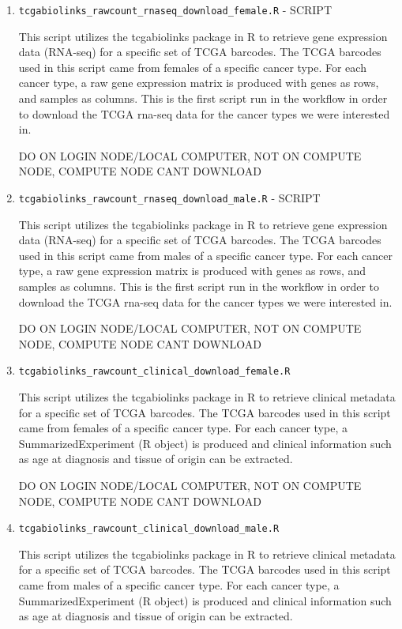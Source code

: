 \documentclass[10pt]{article}
\begin{document}
\begin{enumerate}
\item\texttt{tcgabiolinks\_rawcount\_rnaseq\_download\_female.R} - SCRIPT

This script utilizes the tcgabiolinks package in R to retrieve gene expression data (RNA-seq) for a specific set of TCGA barcodes. The TCGA barcodes used in this script came from females of a specific cancer type. For each cancer type, a raw gene expression matrix is produced with genes as rows, and samples as columns. This is the first script run in the workflow in order to download the TCGA rna-seq data for the cancer types we were interested in.

DO ON LOGIN NODE/LOCAL COMPUTER, NOT ON COMPUTE NODE, COMPUTE NODE CANT DOWNLOAD

\item\texttt{tcgabiolinks\_rawcount\_rnaseq\_download\_male.R} - SCRIPT

This script utilizes the tcgabiolinks package in R to retrieve gene expression data (RNA-seq) for a specific set of TCGA barcodes. The TCGA barcodes used in this script came from males of a specific cancer type. For each cancer type, a raw gene expression matrix is produced with genes as rows, and samples as columns. This is the first script run in the workflow in order to download the TCGA rna-seq data for the cancer types we were interested in.

DO ON LOGIN NODE/LOCAL COMPUTER, NOT ON COMPUTE NODE, COMPUTE NODE CANT DOWNLOAD

\item\texttt{tcgabiolinks\_rawcount\_clinical\_download\_female.R}

This script utilizes the tcgabiolinks package in R to retrieve clinical metadata for a specific set of TCGA barcodes. The TCGA barcodes used in this script came from females of a specific cancer type. For each cancer type, a SummarizedExperiment (R object) is produced and clinical information such as age at diagnosis and tissue of origin can be extracted.

DO ON LOGIN NODE/LOCAL COMPUTER, NOT ON COMPUTE NODE, COMPUTE NODE CANT DOWNLOAD

\item\texttt{tcgabiolinks\_rawcount\_clinical\_download\_male.R}

This script utilizes the tcgabiolinks package in R to retrieve clinical metadata for a specific set of TCGA barcodes. The TCGA barcodes used in this script came from males of a specific cancer type. For each cancer type, a SummarizedExperiment (R object) is produced and clinical information such as age at diagnosis and tissue of origin can be extracted.


\end{enumerate}
\end{document}
